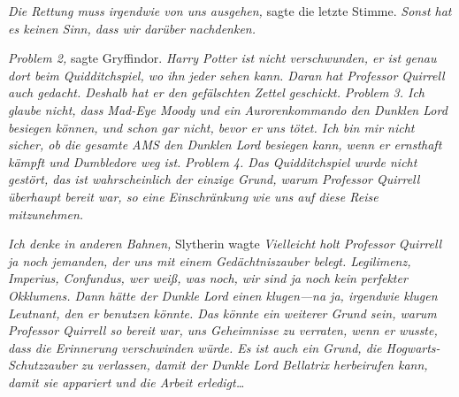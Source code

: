 \emph{Die Rettung muss irgendwie von uns ausgehen,} sagte die letzte Stimme. \emph{Sonst hat es keinen Sinn, dass wir darüber nachdenken.}

\emph{Problem 2,} sagte Gryffindor. \emph{Harry Potter ist nicht verschwunden, er ist genau dort beim Quidditchspiel, wo ihn jeder sehen kann. Daran hat Professor Quirrell auch gedacht. Deshalb hat er den gefälschten Zettel geschickt.}
\emph{Problem 3. Ich glaube nicht, dass Mad-Eye Moody und ein Aurorenkommando den Dunklen Lord besiegen können, und schon gar nicht, bevor er uns tötet. Ich bin mir nicht sicher, ob die gesamte AMS den Dunklen Lord besiegen kann, wenn er ernsthaft kämpft und Dumbledore weg ist.}
\emph{Problem 4. Das Quidditchspiel wurde nicht gestört, das ist wahrscheinlich der einzige Grund, warum Professor Quirrell überhaupt bereit war, so eine Einschränkung wie uns auf diese Reise mitzunehmen.}

\emph{Ich denke in anderen Bahnen,} Slytherin wagte \emph{Vielleicht holt Professor Quirrell ja noch jemanden, der uns mit einem Gedächtniszauber belegt. Legilimenz, Imperius, Confundus, wer weiß, was noch, wir sind ja noch kein perfekter Okklumens. Dann hätte der Dunkle Lord einen klugen—na ja, irgendwie klugen Leutnant, den er benutzen könnte. Das könnte ein weiterer Grund sein, warum Professor Quirrell so bereit war, uns Geheimnisse zu verraten, wenn er wusste, dass die Erinnerung verschwinden würde. Es ist auch ein Grund, die Hogwarts-Schutzzauber zu verlassen, damit der Dunkle Lord Bellatrix herbeirufen kann, damit sie appariert und die Arbeit erledigt…}

